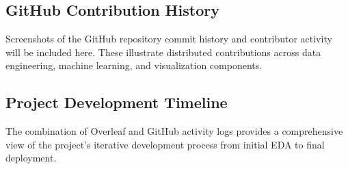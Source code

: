 \documentclass[conference]{IEEEtran}
\begin{document}
\subsection{GitHub Contribution History}

Screenshots of the GitHub repository commit history and contributor activity will be included here. These illustrate distributed contributions across data engineering, machine learning, and visualization components.

\subsection{Project Development Timeline}

The combination of Overleaf and GitHub activity logs provides a comprehensive view of the project’s iterative development process from initial EDA to final deployment.



\end{document}
